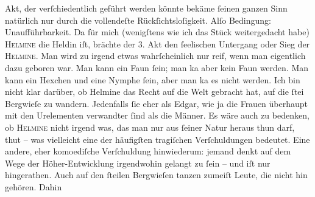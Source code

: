 \begin{ledgroupsized}[t]{13cm}
               Akt, der verſchiedentlich geführt werden könnte bekäme ſeinen ganzen Sinn natürlich
               nur durch die vollendeſte Rückſichtsloſigkeit. Alſo Bedingung: Unaufführbarkeit. Da
               für mich (wenigſtens wie ich das Stück weitergedacht habe) \textsc{Helmine} die Heldin iſt, brächte der 3. Akt den ſeelischen Untergang oder Sieg der \textsc{Helmine}. Man wird zu irgend etwas wahrſcheinlich nur reif, wenn man eigentlich dazu
               geboren war. Man kann ein Faun ſein; man ka{\geminationn}{ }{\pb}aber kein Faun werden.
               Man kann ein Hexchen und eine Nymphe ſein, aber man ka{\geminationn}
               es nicht werden. Ich bin nicht klar darüber, ob Helmine das Recht auf die Welt gebracht hat, auf die
                  ſtei Bergwieſe zu wandern. Jedenfalls ſie eher als Edgar, wie ja die Frauen
               überhaupt mit den Urelementen verwandter ſind als die Männer. Es wäre auch zu
               bedenken, ob \textsc{Helmine} nicht irgend was, das man nur aus {\pb}ſeiner Natur heraus
               thun darf, \label{K_L01604_2v}\label{K_L01604_2h} thut – was
               vielleicht eine der häufigſten tragiſchen Verſchuldungen bedeutet. Eine andere, eher
               komoediſche Verſchuldung hinwiederum: jemand denkt auf dem Wege der \introOben{}Höher-\introOben{}Entwicklung irgendwohin gelangt  zu ſein – und iſt nur \label{K_L01604_3v}\label{K_L01604_3h} hingerathen.
               Auch auf den ſteilen Bergwieſen tanzen zumeiſt Leute, die nicht hin gehören. Dahin

\end{ledgroupsized}
